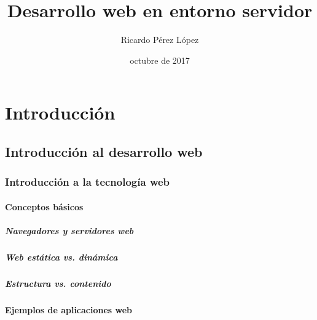 \documentclass[a4paper,11pt,spanish]{sphinxmanual}
\title{Desarrollo web en entorno servidor}
\date{octubre de 2017}
\author{Ricardo Pérez López}
\begin{document}
\maketitle
\sphinxtableofcontents
{}\label{\detokenize{index_latex::doc}}



\part{Introducción}
\label{\detokenize{introduccion:introduccion}}\label{\detokenize{introduccion:desarrollo-web-en-entorno-servidor}}\label{\detokenize{introduccion::doc}}

\chapter{Introducción al desarrollo web}
\label{\detokenize{introduccion:introduccion-al-desarrollo-web}}

\section{Introducción a la tecnología web}
\label{\detokenize{introduccion:introduccion-a-la-tecnologia-web}}

\subsection{Conceptos básicos}
\label{\detokenize{introduccion:conceptos-basicos}}

\subsubsection{Navegadores y servidores web}
\label{\detokenize{introduccion:navegadores-y-servidores-web}}

\subsubsection{Web estática vs. dinámica}
\label{\detokenize{introduccion:web-estatica-vs-dinamica}}

\subsubsection{Estructura vs. contenido}
\label{\detokenize{introduccion:estructura-vs-contenido}}

\subsection{Ejemplos de aplicaciones web}
\label{\detokenize{introduccion:ejemplos-de-aplicaciones-web}}
\end{document}
